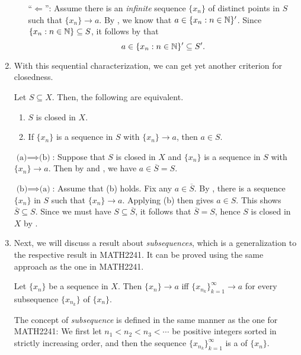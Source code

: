 \begin{enumerate}
\begin{pf}
\begin{enumerate}
``\(\Leftarrow\)'': Assume there is an \emph{infinite} sequence \(\{x_n\}\) of
distinct points in \(S\) such that \(\{x_n\}\to a\). By
, we know that \(a\in\{x_n:n\in\mathbb{N}\}'\). Since
\(\{x_n:n\in\mathbb{N}\}\subseteq S\), it follows by 
that
\[
a\in\{x_n:n\in\mathbb{N}\}'\subseteq S'.
\]
\end{enumerate}
\end{pf}
\item With this sequential characterization, we can get yet another criterion
for closedness.

\begin{proposition}
\label{prp:closed-seq-crit}
Let \(S\subseteq X\). Then, the following are equivalent.
\begin{enumerate}
\item \(S\) is closed in \(X\).
\item If \(\{x_n\}\) is a sequence in \(S\) with \(\{x_n\}\to a\), then \(a\in
S\).
\end{enumerate}
\end{proposition}
\begin{pf}
\underline{\(\text{(a)}\implies \text{(b)}\)}: Suppose that \(S\) is closed in \(X\) and
\(\{x_n\}\) is a sequence in \(S\) with \(\{x_n\}\to a\). Then by
 and , we have
\(a\in \overline{S}=S\).

\underline{\(\text{(b)}\implies \text{(a)}\)}: Assume that (b) holds. Fix any
\(a\in\overline{S}\). By , there is a sequence
\(\{x_n\}\) in \(S\) such that \(\{x_n\}\to a\). Applying (b) then gives \(a\in
S\). This shows \(\overline{S}\subseteq S\). Since we must have \(S\subseteq
\overline{S}\), it follows that \(\overline{S}=S\), hence \(S\) is closed in
\(X\) by .
\end{pf}
\item Next, we will discuss a result about \emph{subsequences}, which is
a generalization to the respective result in MATH2241. It can be proved using
the same approach as the one in MATH2241.
\begin{proposition}
\label{prp:subseq-same-lim}
Let \(\{x_n\}\) be a sequence in \(X\). Then \(\{x_n\}\to a\) iff
\(\{x_{n_k}\}_{k=1}^{\infty}\to a\) for every subsequence \(\{x_{n_k}\}\) of
\(\{x_n\}\).
\end{proposition}
\begin{note}
The concept of \emph{subsequence} is defined in the same manner as the one for
MATH2241: We first let \(n_1<n_2<n_3<\dotsb\) be positive integers sorted in
strictly increasing order, and then the sequence \(\{x_{n_k}\}_{k=1}^{\infty}\)
is a  of \(\{x_n\}\).
\end{note}


\end{enumerate}
